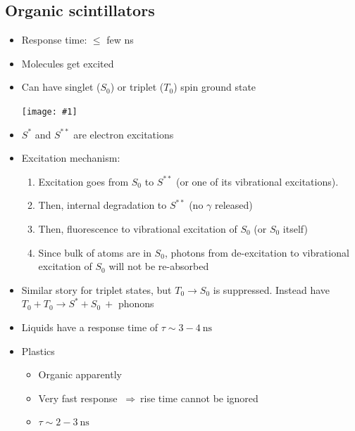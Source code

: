 \documentclass[11pt]{article}
\newcommand{\ns}{\text{ns}}
\newcommand{\thus}{$~\Rightarrow~$}
\newcommand{\embedimgw}[2]{\begin{center}\texttt{[image: \#1]}\end{center}}
\begin{document}
\subsection{Organic scintillators}
\begin{itemize}
  \item Response time: $\leq$ few ns
  \item Molecules get excited
  \item Can have singlet ($S_0$) or triplet ($T_0$) spin ground state
  \embedimgw{figs/scint_energies.png}{0.8}
  \item $S^*$ and $S^{**}$ are electron excitations
  \item Excitation mechanism:
  \begin{enumerate}
    \item Excitation goes from $S_0$ to $S^{**}$ (or one of its vibrational excitations).
    \item Then, internal degradation to $S^{**}$ (no $\gamma$ released)
    \item Then, fluorescence  to vibrational excitation of $S_0$ (or $S_0$ itself)
    \item Since bulk of atoms are in $S_0$, photons from de-excitation to vibrational excitation of $S_0$ will not be re-absorbed
  \end{enumerate}
  \item Similar story for triplet states, but $T_0\rightarrow S_0$ is suppressed. Instead have $T_0+T_0 \rightarrow S^*+S_0~+$ phonons
  \item Liquids have a response time of $\tau\sim 3-4~\ns$
  \item Plastics 
  \begin{itemize}
    \item Organic apparently
    \item Very fast response \thus rise time cannot be ignored
    \item $\tau\sim 2-3~\ns$
  \end{itemize}
\end{itemize}
\end{document}
